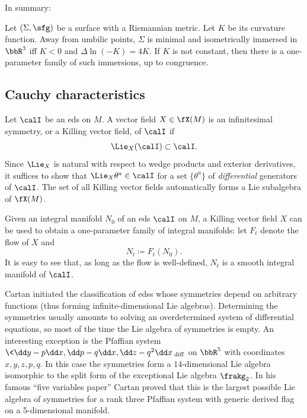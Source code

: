 In summary:
\begin{thm}[Ricci]
    Let $(\Sigma,\sfg)$ be a surface with a Riemannian metric. Let $K$ be its curvature function. Away from umbilic points, $\Sigma$ is minimal and isometrically immersed in $\bbR^3$ iff $K<0$ and $\Delta\ln (-K)=4K$. If $K$ is not constant, then there is a one-parameter family of such immersions, up to congruence.
\end{thm}








\subsection{Cauchy characteristics}


\begin{defn}
    Let $\calI$ be an \gls{eds} on $M$. A vector field $X\in\fX(M)$ is an infinitesimal symmetry, or a Killing vector field, of $\calI$ if 
    \[\Lie_X (\calI)\subset \calI.\]
    Since $\Lie_X$ is natural with respect to wedge products and exterior derivatives, it suffices to show that $\Lie_X \theta^a\in \calI$ for a set $\{\theta^a\}$ of \emph{differential} generators of $\calI$. The set of all Killing vector fields automatically forms a Lie subalgebra of $\fX(M)$.
\end{defn}

Given an integral manifold $N_0$ of an \gls{eds} $\calI$ on $M$, a Killing vector field $X$ can be used to obtain a one-parameter family of integral manifolds: let $F_t$ denote the flow of $X$ and 
\[N_t\coloneqq F_t(N_0).\label{eq 7.3 Ivey}\]
It is easy to see that, as long as the flow is well-defined, $N_t$ is a smooth integral manifold of $\calI$. 

\begin{rem}
    Cartan initiated the classification of \glspl{eds} whose symmetries depend on arbitrary functions (thus forming infinite-dimensional Lie algebras). Determining the symmetries usually amounts to solving an overdetermined system of differential equations, so most of the time the Lie algebra of symmetries is empty. An interesting exception is the Pfaffian system $\<\dd y-p\dd x,\dd p-q\dd x,\dd z-q^2\dd x\>_{\mathrm{diff}}$ on $\bbR^5$ with coordinates $x,y,z,p,q$. In this case the symmetries form a $14$-dimensional Lie algebra isomorphic to the split form of the exceptional Lie algebra $\frakg_2$. In his famous ``five variables paper'' Cartan proved that this is the largest possible Lie algebra of symmetries for a rank three Pfaffian system with generic derived flag on a 5-dimensional manifold.
\end{rem}


